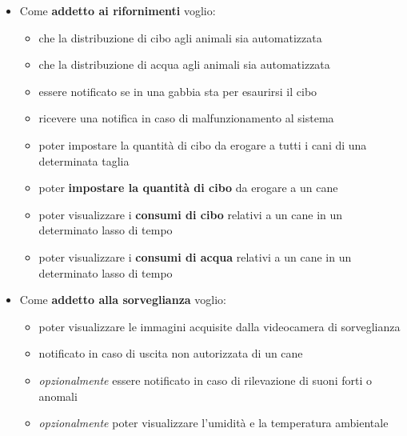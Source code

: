 \begin{itemize}
            \item Come \textbf{addetto ai  rifornimenti}
            voglio:
            \begin{itemize}
                \item che la distribuzione di cibo agli animali sia automatizzata
                \item che la distribuzione di acqua agli animali sia automatizzata
                \item essere notificato se in una gabbia sta per esaurirsi il cibo
                \item ricevere una notifica in caso di malfunzionamento al sistema
                \item poter impostare la quantità di cibo da erogare a tutti i cani di una determinata taglia
                \item poter \textbf{impostare la quantità di cibo} da erogare a un cane
                \item poter visualizzare i \textbf{consumi di cibo} relativi a un cane in un determinato lasso di tempo
                \item poter visualizzare i \textbf{consumi di acqua} relativi a un cane in un determinato lasso di tempo
            \end{itemize}
            
            \item Come \textbf{addetto alla sorveglianza}
            voglio:
            \begin{itemize}
                \item poter visualizzare le immagini acquisite dalla videocamera di sorveglianza
                \item notificato in caso di uscita non autorizzata di un cane
                \item \textit{opzionalmente} essere notificato in caso di rilevazione di suoni forti o anomali
                \item \textit{opzionalmente} poter visualizzare l’umidità e la temperatura ambientale 
            \end{itemize}
        \end{itemize}
        
